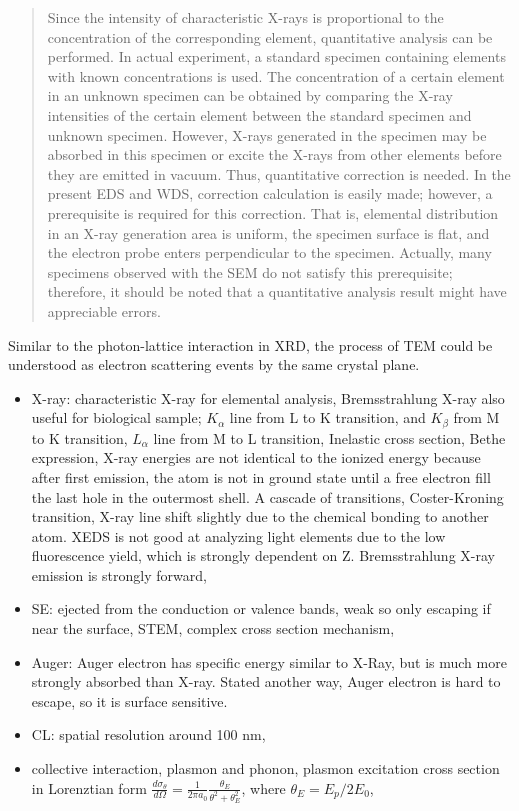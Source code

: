 \begin{quotation}
Since the intensity of characteristic X-rays is proportional to the concentration of the corresponding element, quantitative analysis
can be performed. In actual experiment, a standard specimen containing elements with known concentrations is used. The
concentration of a certain element in an unknown specimen can be obtained by comparing the X-ray intensities of the certain element
between the standard specimen and unknown specimen. However, X-rays generated in the specimen may be absorbed in
this specimen or excite the X-rays from other elements before they are emitted in vacuum. Thus, quantitative correction is needed.
In the present EDS and WDS, correction calculation is easily made; however, a prerequisite is required for this correction. That is,
elemental distribution in an X-ray generation area is uniform, the specimen surface is flat, and the electron probe enters perpendicular to the specimen. Actually, many specimens observed with the SEM do not satisfy this prerequisite; therefore, it should be noted that a quantitative analysis result might have appreciable errors.
\end{quotation}


\fi


\iffalse
Similar to the photon-lattice interaction in XRD, the process of TEM could be understood as electron scattering events by the same crystal plane. 

\begin{itemize}
\item X-ray: characteristic X-ray for elemental analysis, Bremsstrahlung X-ray also useful for biological sample; $K_\alpha$ line from L to K transition, and $K_\beta$ from M to K transition, $L_\alpha$ line from M to L transition, Inelastic cross section, Bethe expression, X-ray energies are not identical to the ionized energy because after first emission, the atom is not in ground state until a free electron fill the last hole in the outermost shell. A cascade of transitions, Coster-Kroning transition, X-ray line shift slightly due to the chemical bonding to another atom. XEDS is not good at analyzing light elements due to the low fluorescence yield, which is strongly dependent on Z. Bremsstrahlung X-ray emission is strongly forward, 
\item SE: ejected from the conduction or valence bands, weak so only escaping if near the surface, STEM, complex cross section mechanism, 
\item Auger: Auger electron has specific energy similar to X-Ray, but is much more strongly absorbed than X-ray. Stated another way, Auger electron is hard to escape, so it is surface sensitive. 
\item CL: spatial resolution around 100 nm, 
\item collective interaction, plasmon and phonon, plasmon excitation cross section in Lorenztian form $\frac{d\sigma_\theta}{d\Omega} = \frac{1}{2\pi a_0} \frac{\theta_E}{\theta^2 + \theta_E^2}$, where $\theta_E = E_p/2E_0$, 
\end{itemize}


